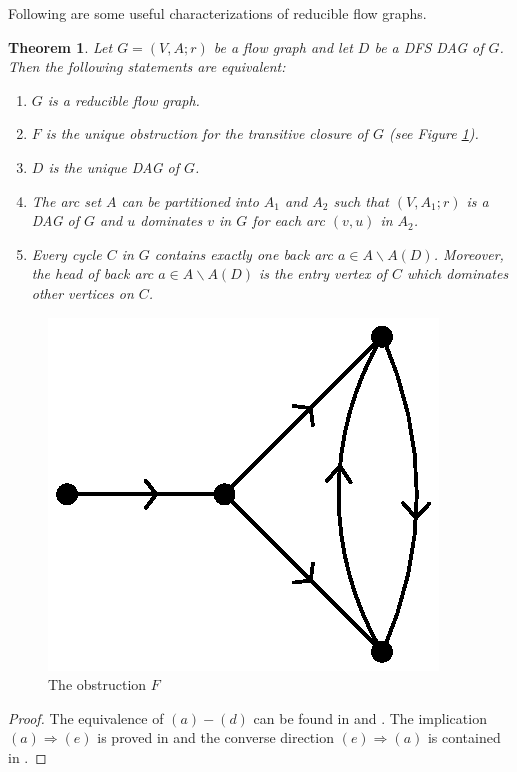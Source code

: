\documentclass[11pt]{article}
\newtheorem{theorem}{Theorem}[section]
\begin{document}
Following are some useful characterizations of reducible flow graphs.
\begin{theorem}
\label{thm:1}
Let $G=(V,A;r)$ be a flow graph and let $D$ be a DFS DAG of $G$. Then the following statements are equivalent:
\begin{enumerate}[label=\emph{(}\alph*\emph{)}]
  \item $G$ is a reducible flow graph.
  \item $F$ is the unique obstruction for the transitive closure of $G$ (see Figure \ref{fig:1}).
  \item $D$ is the unique DAG of $G$.
  \item The arc set $A$ can be partitioned into $A_1$ and $A_2$ such that $(V,A_1;r)$ is a DAG of $G$ and $u$ dominates $v$ in $G$ for each arc $(v,u)$ in $A_2$.
  \item Every cycle $C$ in $G$ contains exactly one back arc $a\in A\backslash A(D)$. Moreover, the head of back arc $a\in A\backslash A(D)$ is the entry vertex of $C$ which dominates other vertices on $C$.
\end{enumerate}
\end{theorem}

\begin{figure}
\centering
\includegraphics[scale=.55]{FASPacking-fig1.eps}
\caption{The obstruction $F$}
\label{fig:1}
\end{figure}

\begin{proof}
The equivalence of $(a)-(d)$ can be found in \cite{HecU1} and \cite{HecU2}. The implication $(a)\Rightarrow (e)$ is proved in \cite{Sham} and the converse direction $(e)\Rightarrow (a)$ is contained in \cite{CheZ}.
\end{proof}
\end{document}
